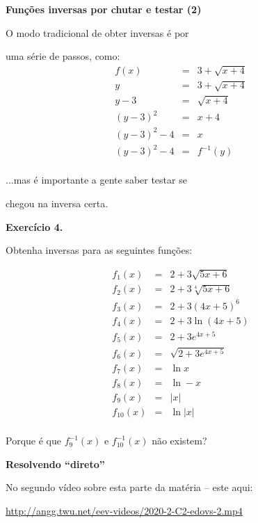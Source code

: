 \documentclass[oneside,12pt]{article}
\begin{document}
\newpage


{\bf Funções inversas por chutar e testar (2)}

O modo tradicional de obter inversas é por

uma série de passos, como:
%
$$\begin{array}{rcl}
  f(x) &=& 3 + \sqrt{x+4} \\
  y &=& 3 + \sqrt{x+4} \\
  y - 3 &=& \sqrt{x+4} \\
  (y - 3)^2 &=& x+4 \\
  (y - 3)^2 - 4 &=& x \\
  (y - 3)^2 - 4 &=& f^{-1}(y) \\
  \end{array}
$$

...mas é importante a gente saber testar se

chegou na inversa certa.


\newpage


{\bf Exercício 4.} 

Obtenha inversas para as seguintes funções:

%
$$\begin{array}{rcl}
  f_1(x) &=& 2 + 3 \sqrt   {5x+6} \\
  f_2(x) &=& 2 + 3 \sqrt[4]{5x+6} \\
  f_3(x) &=& 2 + 3 (4x+5)^6 \\
  f_4(x) &=& 2 + 3 \ln(4x + 5) \\
  f_5(x) &=& 2 + 3 e^{4x + 5} \\
  f_6(x) &=& \sqrt{2 + 3 e^{4x + 5}} \\[10pt]
  f_7(x) &=& \ln x \\
  f_8(x) &=& \ln -x\\
  f_9(x) &=& |x|\\
  f_{10}(x) &=& \ln |x|\\
  \end{array}
$$

\msk

Porque é que $f_9^{-1}(x)$ e $f_{10}^{-1}(x)$ não existem?


\newpage


{\bf Resolvendo ``direto''}

No segundo vídeo sobre esta parte da matéria -- este aqui:

\ssk

{\footnotesize

\url{http://angg.twu.net/eev-videos/2020-2-C2-edovs-2.mp4}

}
\end{document}
